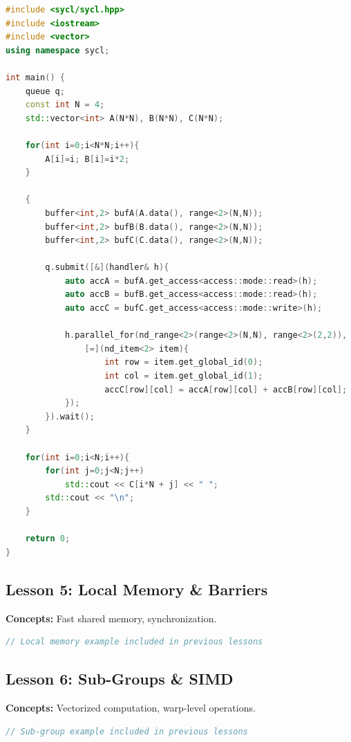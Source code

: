 \documentclass[a4paper,12pt]{article}
\begin{document}
\begin{lstlisting}[language=C++]
#include <sycl/sycl.hpp>
#include <iostream>
#include <vector>
using namespace sycl;

int main() {
    queue q;
    const int N = 4;
    std::vector<int> A(N*N), B(N*N), C(N*N);

    for(int i=0;i<N*N;i++){
        A[i]=i; B[i]=i*2;
    }

    {
        buffer<int,2> bufA(A.data(), range<2>(N,N));
        buffer<int,2> bufB(B.data(), range<2>(N,N));
        buffer<int,2> bufC(C.data(), range<2>(N,N));

        q.submit([&](handler& h){
            auto accA = bufA.get_access<access::mode::read>(h);
            auto accB = bufB.get_access<access::mode::read>(h);
            auto accC = bufC.get_access<access::mode::write>(h);

            h.parallel_for(nd_range<2>(range<2>(N,N), range<2>(2,2)),
                [=](nd_item<2> item){
                    int row = item.get_global_id(0);
                    int col = item.get_global_id(1);
                    accC[row][col] = accA[row][col] + accB[row][col];
            });
        }).wait();
    }

    for(int i=0;i<N;i++){
        for(int j=0;j<N;j++)
            std::cout << C[i*N + j] << " ";
        std::cout << "\n";
    }

    return 0;
}
\end{lstlisting}

\subsection{Lesson 5: Local Memory \& Barriers}
\textbf{Concepts:} Fast shared memory, synchronization.

\begin{lstlisting}[language=C++]
// Local memory example included in previous lessons
\end{lstlisting}

\subsection{Lesson 6: Sub-Groups \& SIMD}
\textbf{Concepts:} Vectorized computation, warp-level operations.

\begin{lstlisting}[language=C++]
// Sub-group example included in previous lessons
\end{lstlisting}
\end{document}
